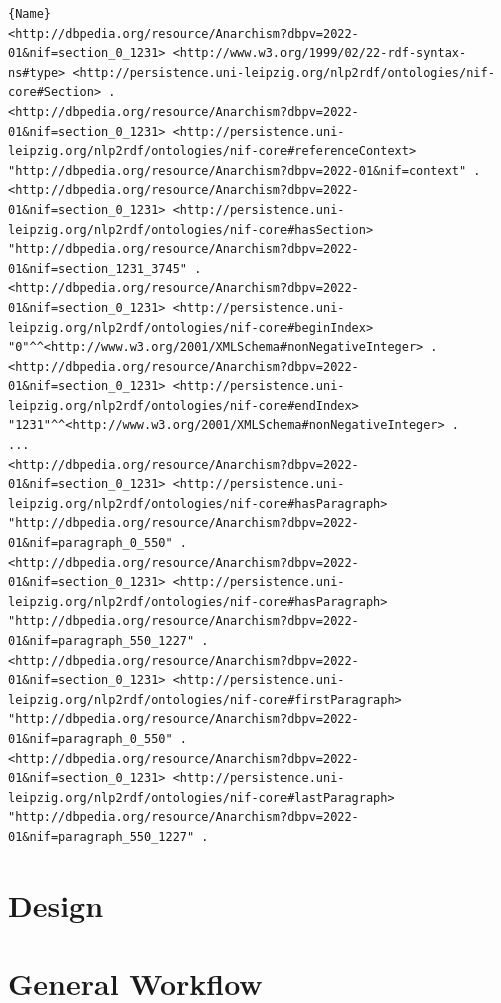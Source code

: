 \documentclass[thesis=M,english,hidelinks]{FITthesis}[2019/12/23]
\begin{document}
\begin{lstlisting}[caption=Example of an output for a Section,frame=tlrb,  label = {lst:nif-links}]{Name}
<http://dbpedia.org/resource/Anarchism?dbpv=2022-01&nif=section_0_1231> <http://www.w3.org/1999/02/22-rdf-syntax-ns#type> <http://persistence.uni-leipzig.org/nlp2rdf/ontologies/nif-core#Section> .
<http://dbpedia.org/resource/Anarchism?dbpv=2022-01&nif=section_0_1231> <http://persistence.uni-leipzig.org/nlp2rdf/ontologies/nif-core#referenceContext> "http://dbpedia.org/resource/Anarchism?dbpv=2022-01&nif=context" .
<http://dbpedia.org/resource/Anarchism?dbpv=2022-01&nif=section_0_1231> <http://persistence.uni-leipzig.org/nlp2rdf/ontologies/nif-core#hasSection> "http://dbpedia.org/resource/Anarchism?dbpv=2022-01&nif=section_1231_3745" .
<http://dbpedia.org/resource/Anarchism?dbpv=2022-01&nif=section_0_1231> <http://persistence.uni-leipzig.org/nlp2rdf/ontologies/nif-core#beginIndex> "0"^^<http://www.w3.org/2001/XMLSchema#nonNegativeInteger> .
<http://dbpedia.org/resource/Anarchism?dbpv=2022-01&nif=section_0_1231> <http://persistence.uni-leipzig.org/nlp2rdf/ontologies/nif-core#endIndex> "1231"^^<http://www.w3.org/2001/XMLSchema#nonNegativeInteger> .
...
<http://dbpedia.org/resource/Anarchism?dbpv=2022-01&nif=section_0_1231> <http://persistence.uni-leipzig.org/nlp2rdf/ontologies/nif-core#hasParagraph> "http://dbpedia.org/resource/Anarchism?dbpv=2022-01&nif=paragraph_0_550" .
<http://dbpedia.org/resource/Anarchism?dbpv=2022-01&nif=section_0_1231> <http://persistence.uni-leipzig.org/nlp2rdf/ontologies/nif-core#hasParagraph> "http://dbpedia.org/resource/Anarchism?dbpv=2022-01&nif=paragraph_550_1227" .
<http://dbpedia.org/resource/Anarchism?dbpv=2022-01&nif=section_0_1231> <http://persistence.uni-leipzig.org/nlp2rdf/ontologies/nif-core#firstParagraph> "http://dbpedia.org/resource/Anarchism?dbpv=2022-01&nif=paragraph_0_550" .
<http://dbpedia.org/resource/Anarchism?dbpv=2022-01&nif=section_0_1231> <http://persistence.uni-leipzig.org/nlp2rdf/ontologies/nif-core#lastParagraph> "http://dbpedia.org/resource/Anarchism?dbpv=2022-01&nif=paragraph_550_1227" .
\end{lstlisting}



\section{Design}

\section{General Workflow}
\end{document}
